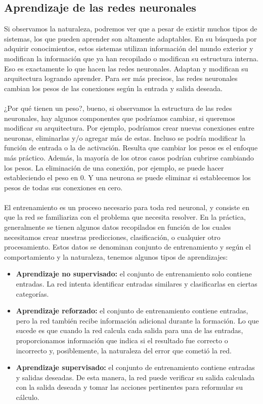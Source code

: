 \documentclass[12pt, a4paper, titlepage]{report}
\begin{document}
				\subsection{Aprendizaje de las redes neuronales}
				Si observamos la naturaleza, podremos ver que a pesar de existir muchos tipos de sistemas, los que  pueden aprender son altamente adaptables. En su búsqueda por adquirir conocimientos, estos sistemas utilizan información del mundo exterior y modifican la información que ya han recopilado o modifican su estructura interna. Eso es exactamente lo que hacen las redes neuronales. Adaptan y modifican su arquitectura logrando aprender. Para ser más precisos, las redes neuronales cambian los pesos de las conexiones según la entrada y salida deseada.\\\\
				¿Por qué tienen un peso?, bueno, si observamos la estructura de las redes neuronales, hay algunos componentes que podríamos cambiar, si queremos modificar su arquitectura. Por ejemplo, podríamos crear nuevas conexiones entre neuronas, eliminarlas y/o agregar más de estas. Incluso se podría modificar la función de entrada o la de activación. Resulta que cambiar los pesos es el enfoque más práctico. Además, la mayoría de los otros casos podrían cubrirse cambiando los pesos. La eliminación de una conexión, por ejemplo, se puede hacer estableciendo el peso en 0. Y una neurona se puede eliminar si establecemos los pesos de todas sus conexiones en cero.\cite{refAprendizajeRedes}\\\\
				El entrenamiento es un proceso necesario para toda red neuronal, y consiste en que la red se familiariza con el problema que necesita resolver. En la práctica, generalmente se tienen algunos datos recopilados en función de los cuales necesitamos crear nuestras predicciones, clasificación, o cualquier otro procesamiento. Estos datos se denominan conjunto de entrenamiento y según el comportamiento y la naturaleza, tenemos algunos tipos de aprendizajes:\\
				\begin{itemize}
					\item \textbf{Aprendizaje no supervisado: }el conjunto de entrenamiento solo contiene entradas. La red intenta identificar entradas similares y clasificarlas en ciertas categorías.
					\item \textbf{Aprendizaje reforzado: }el conjunto de entrenamiento contiene entradas, pero la red también recibe información adicional durante la formación. Lo que sucede es que cuando la red calcula cada salida para una de las entradas, proporcionamos información que indica si el resultado fue correcto o incorrecto y, posiblemente, la naturaleza del error que cometió la red.
					\item \textbf{Aprendizaje supervisado: }el conjunto de entrenamiento contiene entradas y salidas deseadas. De esta manera, la red puede verificar su salida calculada con la salida deseada y tomar las acciones pertinentes para reformular su cálculo.
				\end{itemize}
\end{document}
